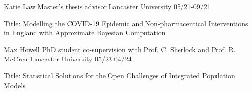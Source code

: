 


\begin{cvhonors}

  \cvhonor
    {Katie Law} %
    {Master's thesis advisor} %
    {Lancaster University} %
    {05/21-09/21} %

    \extracvhonor
    {Title: }
    {Modelling the COVID-19 Epidemic and Non-pharmaceutical Interventions in England with Approximate Bayesian Computation}
    {}
    {}

\end{cvhonors}

\begin{cvhonors}

  \cvhonor
    {Max Howell} %
    {PhD student co-supervision with Prof. C. Sherlock and Prof. R. McCrea} %
    {Lancaster University} %
    {05/23-04/24} %

    \extracvhonor
    {Title: }
    {Statistical Solutions for the Open Challenges of Integrated Population Models}
    {}
    {}

\end{cvhonors}
